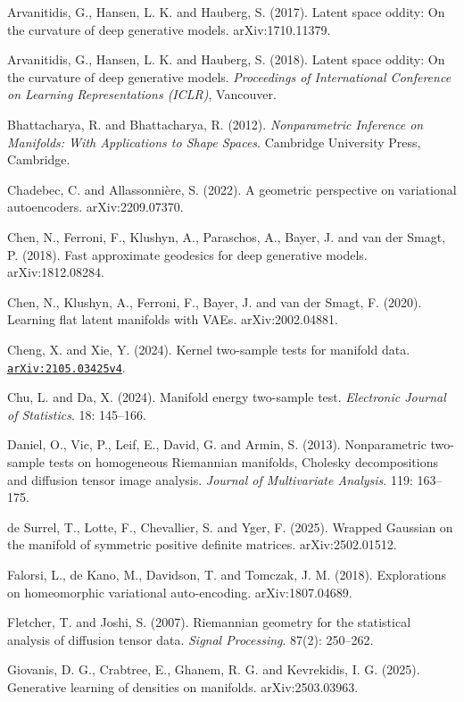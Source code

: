 \begin{bookreferences}
  \item Arvanitidis, G., Hansen, L. K. and Hauberg, S. (2017). Latent space oddity: On the curvature of deep generative models. arXiv:1710.11379.
  \item Arvanitidis, G., Hansen, L. K. and Hauberg, S. (2018). Latent space oddity: On the curvature of deep generative models. \emph{Proceedings of International Conference on Learning Representations (ICLR)}, Vancouver.
  \item Bhattacharya, R. and Bhattacharya, R. (2012). \emph{Nonparametric Inference on Manifolds: With Applications to Shape Spaces}. Cambridge University Press, Cambridge.
  \item Chadebec, C. and Allassonnière, S. (2022). A geometric perspective on variational autoencoders. arXiv:2209.07370.
  \item Chen, N., Ferroni, F., Klushyn, A., Paraschos, A., Bayer, J. and van der Smagt, P. (2018). Fast approximate geodesics for deep generative models. arXiv:1812.08284.
  \item Chen, N., Klushyn, A., Ferroni, F., Bayer, J. and van der Smagt, F. (2020). Learning flat latent manifolds with VAEs. arXiv:2002.04881.
  \item Cheng, X. and Xie, Y. (2024). Kernel two-sample tests for manifold data. \href{https://arxiv.org/abs/2105.03425v4}{\nolinkurl{arXiv:2105.03425v4}}.
  \item Chu, L. and Da, X. (2024). Manifold energy two-sample test. \emph{Electronic Journal of Statistics}. 18: 145–166.
  \item Daniel, O., Vic, P., Leif, E., David, G. and Armin, S. (2013). Nonparametric two-sample tests on homogeneous Riemannian manifolds, Cholesky decompositions and diffusion tensor image analysis. \emph{Journal of Multivariate Analysis}. 119: 163–175.
  \item de Surrel, T., Lotte, F., Chevallier, S. and Yger, F. (2025). Wrapped Gaussian on the manifold of symmetric positive definite matrices. arXiv:2502.01512.
  \item Falorsi, L., de Kano, M., Davidson, T. and Tomczak, J. M. (2018). Explorations on homeomorphic variational auto-encoding. arXiv:1807.04689.
  \item Fletcher, T. and Joshi, S. (2007). Riemannian geometry for the statistical analysis of diffusion tensor data. \emph{Signal Processing}. 87(2): 250–262.
  \item Giovanis, D. G., Crabtree, E., Ghanem, R. G. and Kevrekidis, I. G. (2025). Generative learning of densities on manifolds. arXiv:2503.03963.

\end{bookreferences}
